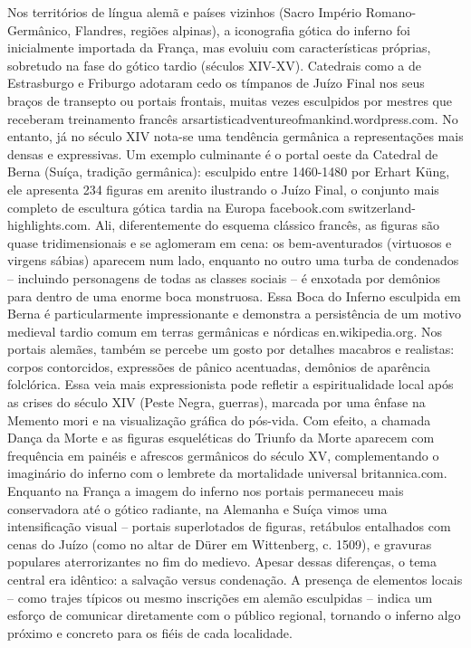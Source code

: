 Nos territórios de língua alemã e países vizinhos (Sacro Império Romano-Germânico, Flandres, regiões alpinas), a iconografia gótica do inferno foi inicialmente importada da França, mas evoluiu com características próprias, sobretudo na fase do gótico tardio (séculos XIV-XV). Catedrais como a de Estrasburgo e Friburgo adotaram cedo os tímpanos de Juízo Final nos seus braços de transepto ou portais frontais, muitas vezes esculpidos por mestres que receberam treinamento francês arsartisticadventureofmankind.wordpress.com. No entanto, já no século XIV nota-se uma tendência germânica a representações mais densas e expressivas. Um exemplo culminante é o portal oeste da Catedral de Berna (Suíça, tradição germânica): esculpido entre 1460-1480 por Erhart Küng, ele apresenta 234 figuras em arenito ilustrando o Juízo Final, o conjunto mais completo de escultura gótica tardia na Europa facebook.com switzerland-highlights.com. Ali, diferentemente do esquema clássico francês, as figuras são quase tridimensionais e se aglomeram em cena: os bem-aventurados (virtuosos e virgens sábias) aparecem num lado, enquanto no outro uma turba de condenados -- incluindo personagens de todas as classes sociais -- é enxotada por demônios para dentro de uma enorme boca monstruosa. Essa Boca do Inferno esculpida em Berna é particularmente impressionante e demonstra a persistência de um motivo medieval tardio comum em terras germânicas e nórdicas en.wikipedia.org. Nos portais alemães, também se percebe um gosto por detalhes macabros e realistas: corpos contorcidos, expressões de pânico acentuadas, demônios de aparência folclórica. Essa veia mais expressionista pode refletir a espiritualidade local após as crises do século XIV (Peste Negra, guerras), marcada por uma ênfase na Memento mori e na visualização gráfica do pós-vida. Com efeito, a chamada Dança da Morte e as figuras esqueléticas do Triunfo da Morte aparecem com frequência em painéis e afrescos germânicos do século XV, complementando o imaginário do inferno com o lembrete da mortalidade universal britannica.com. Enquanto na França a imagem do inferno nos portais permaneceu mais conservadora até o gótico radiante, na Alemanha e Suíça vimos uma intensificação visual -- portais superlotados de figuras, retábulos entalhados com cenas do Juízo (como no altar de Dürer em Wittenberg, c. 1509), e gravuras populares aterrorizantes no fim do medievo. Apesar dessas diferenças, o tema central era idêntico: a salvação versus condenação. A presença de elementos locais -- como trajes típicos ou mesmo inscrições em alemão esculpidas -- indica um esforço de comunicar diretamente com o público regional, tornando o inferno algo próximo e concreto para os fiéis de cada localidade.

